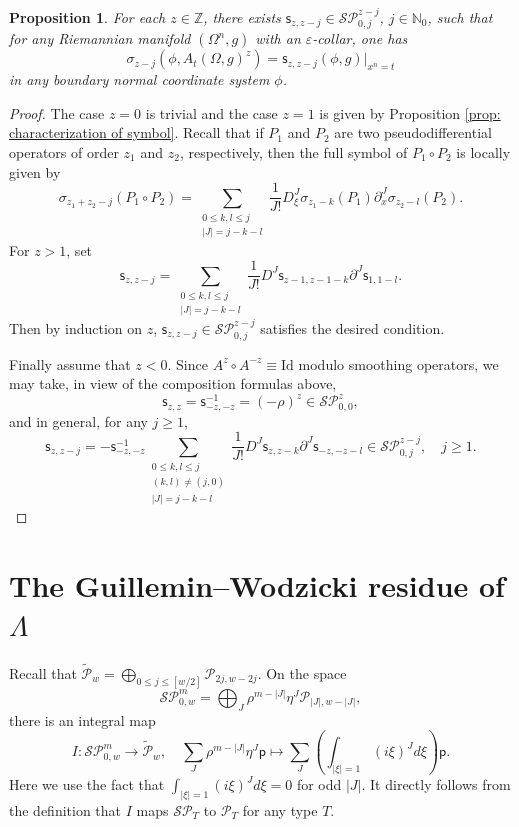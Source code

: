 \documentclass[11pt]{amsart}
\newcommand*{\Id}{\mathrm{Id}}
\newtheorem{proposition}[theorem]{Proposition}
\theoremstyle{definition}
\numberwithin{equation}{section}
\begin{document}
\begin{proposition}\label{prop: characterization of symbol A^z}
    For each $z\in\mathbb Z$, there exists $\mathsf s_{z,z-j}\in\mathcal{SP}_{0,j}^{z-j}$, $j\in\mathbb N_0$, such that for any Riemannian manifold $(\Omega^n,g)$ with an $\varepsilon$-collar,   one has
    \[\sigma_{z-j}(\phi,A_t(\Omega,g)^z) = \mathsf s_{z,z-j}(\phi,g)|_{x^n=t} \]
    in any boundary normal coordinate system $\phi$.
\end{proposition}
\begin{proof}
    The case $z=0$ is trivial and the case $z=1$ is given by  Proposition \ref{prop: characterization of symbol}. Recall that if $P_1$ and $P_2$ are two pseudodifferential operators of order $z_1$ and $z_2$, respectively, then the full symbol of $P_1\circ P_2$ is locally given by
    \[\sigma_{z_1+z_2-j}(P_1\circ P_2) = \sum_{\substack{0\le k,l\le j\\|J| = j-k-l}}\frac{1}{J!}D_{\xi}^J\sigma_{z_1-k}(P_1) \partial_x^J \sigma_{z_2-l}(P_2).\]
    For $z>1$, set
    \[\mathsf s_{z,z-j} = \sum_{\substack{0\le k,l\le j\\|J| = j-k-l}}\frac{1}{J!}D^J\mathsf s_{z-1,z-1-k} \partial^J\mathsf s_{1,1-l}.\]
    Then by induction on $z$,  $\mathsf s_{z,z-j}\in\mathcal{SP}_{0,j}^{z-j}$ satisfies the desired condition.

    Finally assume that $z<0$. Since $A^{z}\circ A^{-z}\equiv\Id$ modulo smoothing operators, we may take, in view of the composition formulas above,  
    \[ 
          \mathsf s_{z,z}   =\mathsf s_{-z,-z}^{-1} = (-\rho)^{z}\in\mathcal{SP}_{0,0}^{z},
     \]
     and in general, for any $j \ge 1$,      
     \[     \mathsf s_{z,z-j}   = -\mathsf s_{-z,-z}^{-1}\sum_{\substack{0\le k,l\le j\\(k,l)\neq (j,0)\\ |J| = j-k-l}}\frac{1}{J!}D^J \mathsf s_{z,z-k} \partial^J \mathsf s_{-z,-z-l}\in\mathcal{SP}_{0,j}^{z-j},\quad j\ge 1.
    \]
\end{proof}

\section{The Guillemin--Wodzicki residue of $\Lambda$} \label{sec:GWResidue}

Recall that $\widetilde{\mathcal P}_{w} = \bigoplus_{0\le j\le[w/2]}\mathcal P_{2j,w-2j}$. On the space 
\[\mathcal{SP}_{0,w}^m = \bigoplus_{J} \rho^{m-|J|}\eta^J \mathcal P_{|J|,w-|J|},\] there is an integral map 
\[I:\mathcal{SP}_{0,w}^m\to\widetilde{\mathcal P}_w,\quad \sum_{J}\rho^{m-|J|}\eta^J\mathsf p 
\mapsto \sum_{J} \left(\int_{|\xi|=1}(i\xi)^Jd\xi\right) \mathsf p.\] 
Here we use the fact that  $\int_{|\xi|=1}(i\xi)^J d\xi = 0$ for odd $|J|$. It directly follows from the definition that $I$ maps $\mathcal{SP}_T$ to $\mathcal P_T$ for any type $T$. 
\end{document}
